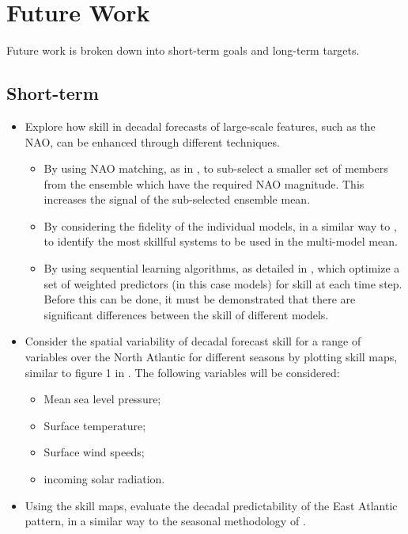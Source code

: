 \documentclass{article}
\begin{document}
\section*{Future Work}

Future work is broken down into short-term goals and long-term targets. 

\subsection*{Short-term}

\begin{itemize}
    \item Explore how skill in decadal forecasts of large-scale features, such as the NAO, can be enhanced through different techniques.
    \begin{itemize}
        \item By using NAO matching, as in \cite{smith2020north}, to sub-select a smaller set of members from the ensemble which have the required NAO magnitude. This increases the signal of the sub-selected ensemble mean.
        \item By considering the fidelity of the individual models, in a similar way to \cite{gonzalez2016long}, to identify the most skillful systems to be used in the multi-model mean.
        \item By using sequential learning algorithms, as detailed in \cite{gonzalez2021new}, which optimize a set of weighted predictors (in this case models) for skill at each time step. Before this can be done, it must be demonstrated that there are significant differences between the skill of different models.
    \end{itemize}
    \item Consider the spatial variability of decadal forecast skill for a range of variables over the North Atlantic for different seasons by plotting skill maps, similar to figure 1 in \cite{smith2020north}. The following variables will be considered:
    \begin{itemize}
        \item Mean sea level pressure;
        \item Surface temperature;
        \item Surface wind speeds;
        \item incoming solar radiation.
    \end{itemize}
    \item Using the skill maps, evaluate the decadal predictability of the East Atlantic pattern, in a similar way to the seasonal methodology of \cite{thornton2023seasonal}.
\end{itemize}
\end{document}
